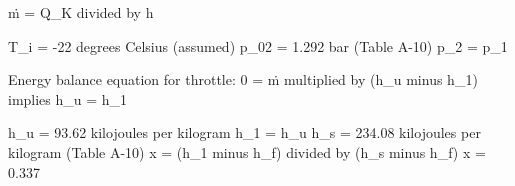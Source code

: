 ṁ = Q_K divided by h  

T_i = -22 degrees Celsius (assumed)  
p_02 = 1.292 bar (Table A-10)  
p_2 = p_1  

Energy balance equation for throttle:  
0 = ṁ multiplied by (h_u minus h_1) implies h_u = h_1  

h_u = 93.62 kilojoules per kilogram  
h_1 = h_u  
h_s = 234.08 kilojoules per kilogram (Table A-10)  
x = (h_1 minus h_f) divided by (h_s minus h_f)  
x = 0.337